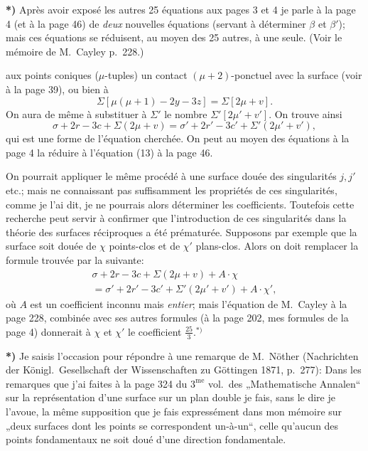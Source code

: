 \documentclass{article}
\begin{document}
\textbf{*)} Après avoir exposé les autres 25 équations aux pages 3 et 4 je parle à la page 4 (et à la page 46) de \emph{deux} nouvelles équations (servant à déterminer $\beta$ et $\beta'$); mais ces équations se réduisent, au moyen des 25 autres, à une seule. (Voir le mémoire de M.~Cayley p.~228.)

aux points coniques ($\mu$-tuples) un contact $(\mu + 2)$-ponctuel avec la surface (voir à la page 39), ou bien à
\[
\Sigma [\mu(\mu + 1) - 2y - 3z] = \Sigma [2\mu + v].
\]
On aura de même à substituer à $\Sigma'$ le nombre $\Sigma' [2\mu' + v']$. On trouve ainsi
\[
\sigma + 2r - 3c + \Sigma(2\mu + v) = \sigma' + 2r' - 3c' + \Sigma'(2\mu' + v'),
\]
qui est une forme de l'équation cherchée. On peut au moyen des équations à la page 4 la réduire à l'équation (13) à la page 46.

On pourrait appliquer le même procédé à une surface douée des singularités $j, j'$ etc.; mais ne connaissant pas suffisamment les propriétés de ces singularités, comme je l'ai dit, je ne pourrais alors déterminer les coefficients. Toutefois cette recherche peut servir à confirmer que l'introduction de ces singularités dans la théorie des surfaces réciproques a été prématurée. Supposons par exemple que la surface soit douée de $\chi$ points-clos et de $\chi'$ plans-clos. Alors on doit remplacer la formule trouvée par la suivante:
\[
\begin{aligned}
\sigma + 2r - 3c + \Sigma(2\mu + v) + A \cdot \chi \\
= \sigma' + 2r' - 3c' + \Sigma'(2\mu' + v') + A \cdot \chi',
\end{aligned}
\]
où $A$ est un coefficient inconnu mais \emph{entier}; mais l'équation de M.~Cayley à la page 228, combinée avec ses autres formules (à la page 202, mes formules de la page 4) donnerait à $\chi$ et $\chi'$ le coefficient $\frac{25}{3}$.${}^{*)}$

\textbf{*)} Je saisis l'occasion pour répondre à une remarque de M.~Nöther (Nachrichten der Königl.\ Gesellschaft der Wissenschaften zu Göttingen 1871, p.~277): Dans les remarques que j'ai faites à la page 324 du $3^{\text{me}}$ vol.\ des „Mathematische Annalen“ sur la représentation d'une surface sur un plan double je fais, sans le dire je l'avoue, la même supposition que je fais expressément dans mon mémoire sur „deux surfaces dont les points se correspondent un-à-un“, celle qu'aucun des points fondamentaux ne soit doué d'une direction fondamentale.
\end{document}
